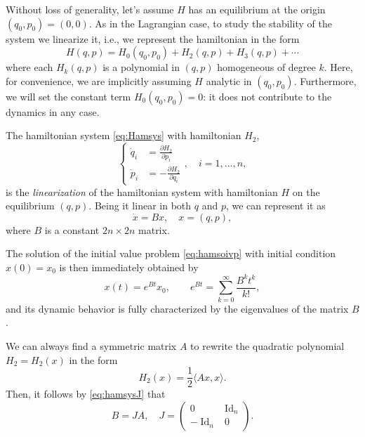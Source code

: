 \documentclass[english,fontsize=11pt,paper=b5]{scrbook}
\numberwithin{equation}{chapter}
\DeclareMathOperator{\Id}{Id}
\DeclareMathOperator{\Id}{Id}
\theoremstyle{definition}
\begin{document}
      Without loss of generality, let's assume $H$ has an equilibrium at the origin $(q_0, p_0) = (0,0)$.
      As in the Lagrangian case, to study the stability of the system we linearize it, i.e., we represent the hamiltonian in the form
      \begin{equation}\label{eq:hamidevl}
        H(q,p) = H_0(q_0,p_0) + H_2(q,p) + H_3(q,p) + \cdots
      \end{equation}
      where each $H_k(q,p)$ is a polynomial in $(q,p)$ homogeneous of degree $k$.
      Here, for convenience, we are implicitly assuming $H$ analytic in $(q_0,p_0)$.
      Furthermore, we will set the constant term $H_0(q_0,p_0) = 0$: it does not contribute to the dynamics in any case.

      The hamiltonian system \eqref{eq:Hamsys} with hamiltonian $H_2$,
      \begin{equation}\label{eq:lienarizedH}
        \left\lbrace
          \begin{aligned}
            \dot q_i &= \frac{\partial H_2}{\partial p_i} \\
            \dot p_i &= -\frac{\partial H_2}{\partial q_i}
          \end{aligned}
        \right .,\quad i=1,\ldots,n,
      \end{equation}
      is the \emph{linearization} of the hamiltonian system with hamiltonian $H$ on the equilibrium $(q,p)$.
      Being it linear in both $q$ and $p$, we can represent it as
      \begin{equation}\label{eq:hamsoivp}
        \dot x = B x,\quad x =(q,p),
      \end{equation}
      where $B$ is a constant $2n\times2n$ matrix.

      The solution of the initial value problem \eqref{eq:hamsoivp} with initial condition $x(0) = x_0$ is then immediately obtained by
      \begin{equation}
        x(t) = e^{Bt} x_0, \qquad e^{Bt} = \sum_{k=0}^\infty \frac{B^k t^k}{k!},
      \end{equation}
      and its dynamic behavior is fully characterized by the eigenvalues of the matrix $B$.

      We can always find a symmetric matrix $A$ to rewrite the quadratic polynomial $H_2 = H_2(x)$ in the form
      \begin{equation}
        H_2(x) = \frac12 \langle Ax, x\rangle.
      \end{equation}
      Then, it follows by \eqref{eq:hamsysJ} that
      \begin{equation}
        B = J A, \quad J = \begin{pmatrix}
          0 & \Id_n \\-\Id_n&0
        \end{pmatrix}.
      \end{equation}
\end{document}
